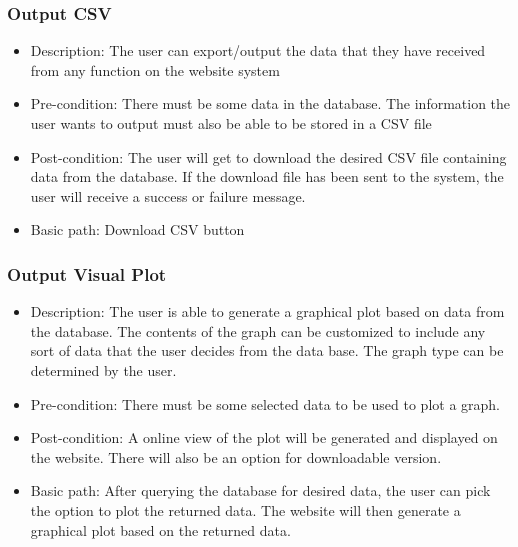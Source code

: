 \documentclass[12pt]{article}
\begin{document}
\subsubsection{Output CSV}
\begin{itemize}
  \item Description: The user can export/output the data that they have received
  from any function on the website system
  \item Pre-condition: There must be some data in the database. The information
  the user wants to output must also be able to be stored in a CSV file 
  \item Post-condition: The user will get to download the desired CSV file
  containing data from the database. If the download file has been sent to the
  system, the user will receive a success or failure message.
  \item Basic path: Download CSV button 
\end{itemize}

\subsubsection{Output Visual Plot}
\begin{itemize}
  \item Description: The user is able to generate a graphical plot based on data
  from the database. The contents of the graph can be customized to include any
  sort of data that the user decides from the data base. The graph type can be determined by the user. 
  \item Pre-condition: There must be some selected data to be used to plot a graph.
  \item Post-condition: A online view of the plot will be generated and
  displayed on the website. There will also be an option for downloadable version. 
  \item Basic path: After querying the database for desired data, the user can
  pick the option to plot the returned data. The website will then generate a
  graphical plot based on the returned data.
\end{itemize}
\end{document}
